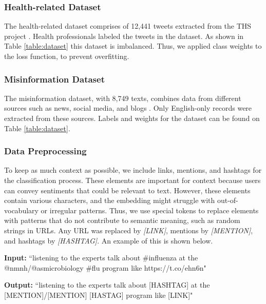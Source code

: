 \subsubsection{Health-related Dataset}
The health-related dataset comprises of 12,441 tweets extracted from the THS project \cite{8622504}. Health professionals labeled the tweets in the dataset.
As shown in Table \ref{table:dataset} this dataset is imbalanced. Thus, we applied class weights to the loss function, to prevent overfitting.

\subsubsection{Misinformation Dataset}
The misinformation dataset, with 8,749 texts, combines data from different sources such as news, social media, and blogs \cite{stephencrone2022,coviddata,covidunesco}. Only English-only records were extracted from these sources. Labels and weights for the dataset can be found on Table \ref{table:dataset}.

\subsubsection{Data Preprocessing}
To keep as much context as possible, we include links, mentions, and hashtags for the classification process. These elements are important for context because users can convey sentiments that could be relevant to text.
However, these elements contain various characters, and the embedding might struggle with out-of-vocabulary or irregular patterns. Thus, we use special tokens to replace elements with patterns that do not contribute
to semantic meaning, such as random strings in URLs. Any URL was replaced by \textit{[LINK]}, mentions by \textit{[MENTION]}, and hashtags by \textit{[HASHTAG]}. An example of this is shown below.

{\footnotesize %
\begin{tcolorbox}[colback=gray!5,colframe=black!50,boxrule=0.4pt,arc=2pt,left=0.5mm,right=0.5mm,top=0.1mm,bottom=0.1mm,title=Example]
\textbf{Input:}  
``listening to the experts talk about \#influenza at the @nmnh/@asmicrobiology \#flu program like https://t.co/ehn6n"

\vspace{0.25em}
\textbf{Output:}  
``listening to the experts talk about [HASHTAG] at the [MENTION]/[MENTION] [HASTAG] program like [LINK]"
\end{tcolorbox}
}


